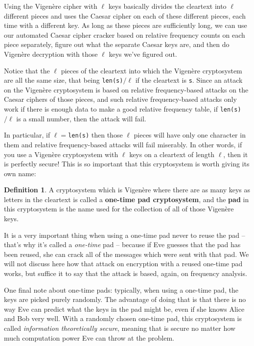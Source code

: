 \documentclass[12pt,letterpaper]{amsbook}
\theoremstyle{definition}
\newtheorem{definition}[theorem]{Definition}
\theoremstyle{remark}
\numberwithin{figure}{section}
\numberwithin{exercise}{chapter}
\numberwithin{section}{chapter}
\numberwithin{equation}{section}
\numberwithin{table}{subsection}
\newcommand{\code}[1]{\colorbox{lg}{\texttt{#1}}}
\newcommand{\ix}[1]{{#1}\index{#1}}
\begin{document}
\vskip3mm
Using the Vigen\`ere cipher with $\ell$ keys basically divides the cleartext
into $\ell$ different pieces and uses the Caesar cipher on each of these
different pieces, each time with a different key.  As long as these pieces are
sufficiently long, we can use our automated Caesar cipher cracker based on
relative frequency counts on each piece separately, figure out what the
separate Caesar keys are, and then do Vigen\`ere decryption with those $\ell$
keys we've figured out.

Notice that the $\ell$ pieces of the cleartext into which the Vigen\`ere
cryptosystem are all the same size, that being \code{len(s)}${}/\ell$ if
the cleartext is \code{s}.  Since an attack on the Vigen\`ere cryptosystem
is based on relative frequency-based attacks on the Caesar ciphers of those
pieces, and such relative frequency-based attacks only work if there is enough
data to make a good relative frequency table, if \code{len(s)}${}/\ell$ is
a small number, then the attack will fail.

In particular, if $\ell={}$\code{len(s)} then those $\ell$ pieces will have
only one character in them and relative frequency-based attacks will fail
miserably.  In other words, if you use a Vigen\`ere cryptosystem with $\ell$
keys on a cleartext of length $\ell$, then it is perfectly secure!  This is
so important that this cryptosystem is worth giving its own name:
\begin{definition}\label{def:onetimepad}
A cryptosystem which is Vigen\`ere where there are as many keys as letters in
the cleartext is called a \textbf{one-time pad cryptosystem}, and the
\textbf{pad} in this cryptosystem is the name used for the collection of all
of those Vigen\`ere keys.
\end{definition}
It is a very important thing when using a one-time pad never to reuse the
pad -- that's why it's called a \textit{one-time} pad -- because if Eve guesses
that the pad has been reused, she can crack all of the messages which were sent
with that pad.  We will not discuss here how that attack on encryption with a
reused one-time pad works, but suffice it to say that the attack is based,
again, on frequency analysis.

One final note about one-time pads: typically, when using a one-time pad, the
keys are picked purely randomly.  The advantage of doing that is that there is
no way Eve can predict what the keys in the pad might be, even if she knows
Alice and Bob very well.  With a randomly chosen one-time pad, this cryptosystem
is called \textit{\ix{information theoretically secure}}, meaning that is
secure no matter how much computation power Eve can throw at the problem.
\end{document}
